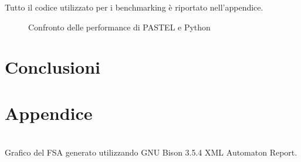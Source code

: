 \documentclass[10pt]{article}
\begin{document}
Tutto il codice utilizzato per i benchmarking è riportato nell'appendice.



\begin{figure}
	\centering
	\caption{Confronto delle performance di PASTEL e Python}
	\label{fig:performance-comparison}
\end{figure}



\section{Conclusioni}\label{section:conclusioni}



\clearpage



\clearpage



\section*{Appendice}\label{section:appendix}

\begin{center}
	\centering
	\\
	Grafico del FSA generato utilizzando GNU Bison 3.5.4 XML Automaton Report.
\end{center}







\end{document}
